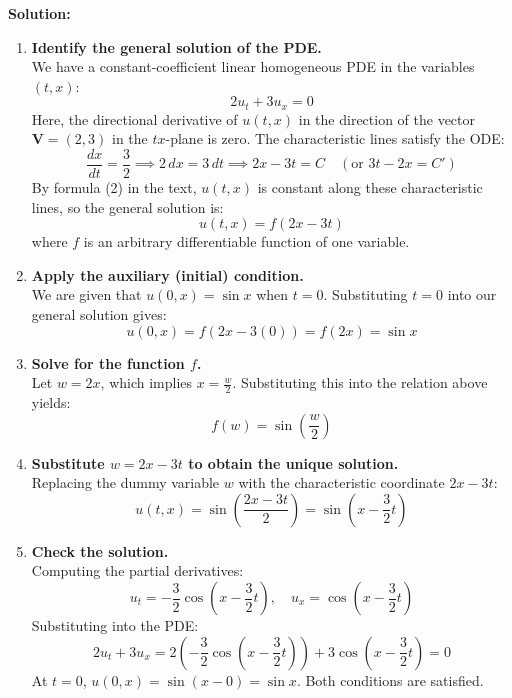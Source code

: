 \documentclass[11pt]{article}
\begin{document}
\textbf{Solution:}
\begin{enumerate}[label=\textbf{Step \arabic*:}]
    \item \textbf{Identify the general solution of the PDE.} \\
    We have a constant-coefficient linear homogeneous PDE in the variables $(t, x)$:
    \[
    2u_t + 3u_x = 0
    \]
    Here, the directional derivative of $u(t, x)$ in the direction of the vector $\mathbf{V} = (2, 3)$ in the $tx$-plane is zero. The characteristic lines satisfy the ODE:
    \[
    \frac{dx}{dt} = \frac{3}{2} \implies 2\,dx = 3\,dt \implies 2x - 3t = C \quad (\text{or } 3t - 2x = C')
    \]
    By formula (2) in the text, $u(t, x)$ is constant along these characteristic lines, so the general solution is:
    \[
    u(t, x) = f(2x - 3t)
    \]
    where $f$ is an arbitrary differentiable function of one variable.

    \item \textbf{Apply the auxiliary (initial) condition.} \\
    We are given that $u(0, x) = \sin x$ when $t = 0$. Substituting $t = 0$ into our general solution gives:
    \[
    u(0, x) = f(2x - 3(0)) = f(2x) = \sin x
    \]

    \item \textbf{Solve for the function $f$.} \\
    Let $w = 2x$, which implies $x = \frac{w}{2}$. Substituting this into the relation above yields:
    \[
    f(w) = \sin\left(\frac{w}{2}\right)
    \]

    \item \textbf{Substitute $w = 2x - 3t$ to obtain the unique solution.} \\
    Replacing the dummy variable $w$ with the characteristic coordinate $2x - 3t$:
    \[
    u(t, x) = \sin\left(\frac{2x - 3t}{2}\right) = \sin\left(x - \frac{3}{2}t\right)
    \]

    \item \textbf{Check the solution.} \\
    Computing the partial derivatives:
    \[
    u_t = -\frac{3}{2}\cos\left(x - \frac{3}{2}t\right), \quad u_x = \cos\left(x - \frac{3}{2}t\right)
    \]
    Substituting into the PDE:
    \[
    2u_t + 3u_x = 2\left(-\frac{3}{2}\cos\left(x - \frac{3}{2}t\right)\right) + 3\cos\left(x - \frac{3}{2}t\right) = 0
    \]
    At $t = 0$, $u(0, x) = \sin(x - 0) = \sin x$. Both conditions are satisfied.
\end{enumerate}
\end{document}
